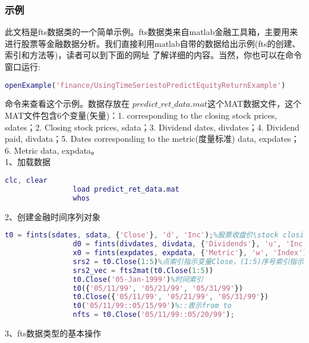         \subsubsection{ 示例}
            \par
            此文档是fts数据类的一个简单示例。fts数据类来自matlab金融工具箱，主要用来进行股票等金融数据分析。我们直接利用matlab自带的数据给出示例(fts的创建、索引和方法等)，读者可以到下面的网址 了解详细的内容。当然，你也可以在命令窗口运行:
            \begin{lstlisting}[language= Matlab]
            openExample('finance/UsingTimeSeriestoPredictEquityReturnExample')
            \end{lstlisting}
            命令来查看这个示例。数据存放在 $predict\_ret\_data.mat$这个MAT数据文件，这个MAT文件包含6个变量(矢量)：1. corresponding to the closing stock prices, sdates；2. Closing stock prices, sdata；3. Dividend dates, divdates；4. Dividend paid, divdata；5. Dates corresponding to the metric(度量标准) data, expdates；6. Metric data, expdata。\\
            1、加载数据
                \begin{lstlisting}[language=Matlab]
                clc, clear
                load predict_ret_data.mat
                whos
                \end{lstlisting}
            2、创建金融时间序列对象
                \begin{lstlisting}[language=Matlab]
                t0 = fints(sdates, sdata, {'Close'}, 'd', 'Inc');%股票收盘价\stock closing prices
                d0 = fints(divdates, divdata, {'Dividends'}, 'u', 'Inc');%股息支付\dividend payments
                x0 = fints(expdates, expdata, {'Metric'}, 'w', 'Index');%explanatory data
                srs2 = t0.Close(1:5)%点索引指示变量Close，(1:5)序号索引指示前5行
                srs2_vec = fts2mat(t0.Close(1:5))
                t0.Close('05-Jan-1999')%时间索引
                t0({'05/11/99', '05/21/99', '05/31/99'})
                t0.Close({'05/11/99', '05/21/99', '05/31/99'})
                t0('05/11/99::05/15/99')%::表示from to
                nfts = t0.Close('05/11/99::05/20/99');
                \end{lstlisting}
            3、fts数据类型的基本操作
